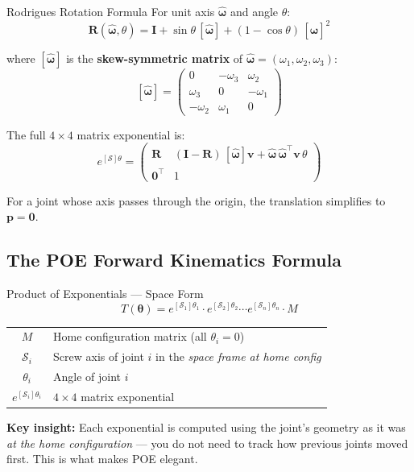 \documentclass[12pt,a4paper]{article}
\newcommand{\vect}[1]{\bm{#1}}
\newcommand{\mat}[1]{\mathbf{#1}}
\begin{document}
\begin{mathbox}{Rodrigues Rotation Formula}
For unit axis $\vect{\hat\omega}$ and angle $\theta$:
\[
  \mat{R}(\vect{\hat\omega},\theta)
  = \mat{I}
  + \sin\theta\,[\vect{\hat\omega}]
  + (1 - \cos\theta)\,[\vect{\hat\omega}]^2
\]

where $[\vect{\hat\omega}]$ is the \textbf{skew-symmetric matrix} of
$\vect{\hat\omega} = (\omega_1,\omega_2,\omega_3)$:
\[
  [\vect{\hat\omega}]
  = \begin{pmatrix}
      0        & -\omega_3 &  \omega_2 \\
      \omega_3 &  0        & -\omega_1 \\
     -\omega_2 &  \omega_1 &  0
    \end{pmatrix}
\]

The full $4\times4$ matrix exponential is:
\[
  e^{[\mathcal{S}]\theta}
  = \begin{pmatrix}
      \mat{R} & (\mat{I}-\mat{R})\,[\vect{\hat\omega}]\vect{v}
              + \vect{\hat\omega}\,\vect{\hat\omega}^\top\vect{v}\,\theta \\
      \vect{0}^\top & 1
    \end{pmatrix}
\]

For a joint whose axis passes through the origin, the translation
simplifies to $\vect{p} = \vect{0}$.
\end{mathbox}

\subsection{The POE Forward Kinematics Formula}

\begin{mathbox}{Product of Exponentials --- Space Form}
\[
  T(\vect{\theta})
  = e^{[\mathcal{S}_1]\theta_1}
    \cdot e^{[\mathcal{S}_2]\theta_2}
    \cdots
    e^{[\mathcal{S}_n]\theta_n}
    \cdot M
\]

\begin{tabular}{cl}
$M$                    & Home configuration matrix (all $\theta_i = 0$) \\
$\mathcal{S}_i$        & Screw axis of joint $i$ in the \emph{space frame at home config} \\
$\theta_i$             & Angle of joint $i$ \\
$e^{[\mathcal{S}_i]\theta_i}$ & $4\times4$ matrix exponential \\
\end{tabular}

\textbf{Key insight:} Each exponential is computed using the joint's
geometry as it was \emph{at the home configuration} --- you do not need
to track how previous joints moved first. This is what makes POE elegant.
\end{mathbox}
\end{document}
